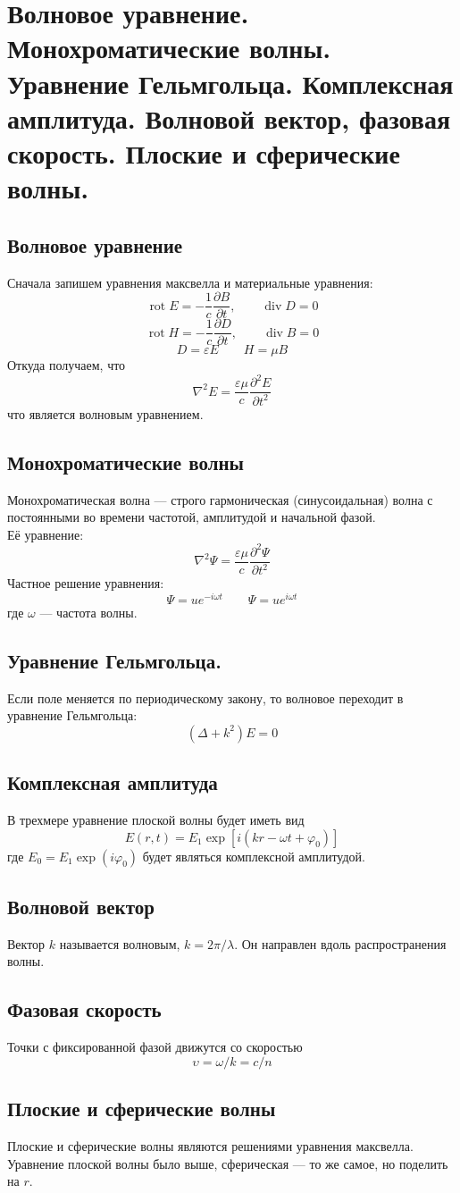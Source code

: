 \section{Волновое уравнение. Монохроматические волны. Уравнение Гельмгольца. Комплексная амплитуда. Волновой вектор, фазовая скорость. Плоские и сферические волны.}
\subsection{Волновое уравнение}
Сначала запишем уравнения максвелла и материальные уравнения: 
$$\operatorname{rot} E = -\frac{1}{c} \frac{\partial B}{\partial t}, \qquad \operatorname{div} D = 0$$
$$\operatorname{rot} H = -\frac{1}{c} \frac{\partial D}{\partial t}, \qquad \operatorname{div} B = 0$$
$$D = \varepsilon E \qquad H = \mu B$$
Откуда получаем, что 
$$\nabla^2 E = \frac{\varepsilon \mu}{c} \frac{\partial^2 E}{\partial t^2}$$
что является волновым уравнением.
\subsection{Монохроматические волны}
Монохроматическая волна --- строго гармоническая (синусоидальная) волна с постоянными во времени частотой, амплитудой и начальной фазой. \\
Её уравнение:
$$\nabla^2 \Psi = \frac{\varepsilon \mu}{c} \frac{\partial^2 \Psi}{\partial t^2}$$
Частное решение уравнения:
$$\Psi = u e^{-i \omega t} \qquad \Psi = u e^{i \omega t}$$
где $\omega$ --- частота волны.
\subsection{Уравнение Гельмгольца.}
Если поле меняется по периодическому закону, то волновое переходит в уравнение Гельмгольца:
$$(\Delta+k^2)E = 0$$
\subsection{Комплексная амплитуда}
В трехмере уравнение плоской волны будет иметь вид 
$$E(r,t) = E_1 \exp [i(kr - \omega t + \varphi_0)]$$
где $E_0 = E_1\exp(i \varphi_0)$ будет являться комплексной амплитудой.\\
\subsection{Волновой вектор}
Вектор $k$ называется волновым, $k = 2\pi / \lambda$. Он направлен вдоль распространения волны.
\subsection{Фазовая скорость}
Точки с фиксированной фазой движутся со скоростью
$$\upsilon = \omega / k = c / n$$
\subsection{Плоские и сферические волны}
Плоские и сферические волны являются решениями уравнения максвелла.
Уравнение плоской волны было выше, сферическая --- то же самое, но поделить на $r$.